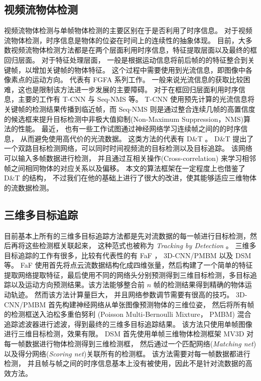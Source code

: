 \subsection{视频流物体检测}
\label{video_detect}
视频流物体检测与单帧物体检测的主要区别在于是否利用了时序信息。 对于视频流物体检测，时序信息是物体的位姿在时间上的连续性的抽象体现。 目前，大多数视频流物体检测方法都是在两个层面利用时序信息，特征提取层面以及最终的框回归层面。 对于特征处理层面， 一般是根据运动信息将前后帧的的特征整合到关键帧，以增加关键帧的物体特征。 这个过程中需要使用到光流信息，即图像中各像素点的运动方向。 代表有 FGFA \cite{zhu2017flow}系列工作。 一般来说光流信息的获取比较困难，这也是限制该方法进一步发展的主要障碍。 对于在框回归层面利用时序信息，主要的工作有 T-CNN \cite{kang2018t, kang2016object} 与 Seq-NMS \cite{han2016seq}等。 T-CNN 使用预先计算的光流信息将关键帧的检测结果传播到临近帧，而 Seq-NMS 则是通过整合连续几帧的高置信度的候选框来提升目标检测中非极大值抑制(Non-Maximum Suppression，NMS)算法的性能。 最近， 也有一些工作试图通过神经网络学习连续帧之间的的时序信息， 从而避免使用高代价的光流数据。 这类方法的代表有 D\&T \cite{feichtenhofer2017detect}。 D\&T 提出了一个双路目标检测网络，可以同时时间视频流的目标检测以及目标追踪。 该网络可以输入多帧数据进行检测， 并且通过互相关操作(Cross-correlation) 来学习相邻帧之间相同物体的对应关系以及偏移。 本文的算法框架在一定程度上也借鉴了 D\&T 的结构， 不过我们在他的基础上进行了很大的改进，使其能够适应三维物体的流数据检测。

\subsection{三维多目标追踪}
\label{tracking}
目前基本上所有的三维多目标追踪方法都是先对流数据的每一帧进行目标检测，然后再将这些检测框关联起来， 这种范式也被称为 \textit{Tracking by Detection} \cite{lenz2015followme}。 三维多目标追踪的工作有很多，比较有代表性的有 FaF \cite{luo2018fast}， 3D-CNN/PMBM \cite{scheidegger2018mono}以及 DSM \cite{frossard2018end}等。 FaF 使用首先将点云流数据结构化成四维张量，然后构建了一个简单的特征提取网络提取特征，最后使用不同的网络头分别预测得到三维目标检测，多目标追踪以及运动方向预测结果。该方法能够整合前 $n$ 帧的检测结果得到精确的物体运动轨迹。 然而该方法计算量巨大， 并且网络参数调节需要有很高的技巧。  3D-CNN/PMBM 首先构建神经网络从单张图像预测物体的三维位姿， 然后将所有帧的检测框送入泊松多重伯努利 (Poisson Multi-Bernoulli Mixture， PMBM) 混合追踪滤波器进行滤波，得到最终的三维多目标追踪结果。 该方法只使用单帧图像进行三维目标检测，效果有限。 DSM 首先使用单帧三维物体检测框架 MV3D \cite{chen2017multi} 对每一帧数据进行物体检测得到三维检测框， 然后通过一个匹配网络(\textit{Matching net})以及得分网络(\textit{Scoring net})关联所有的检测框。 该方法需要对每一帧数据都进行检测， 并且帧与帧之间的时序信息基本上没有被使用，因此不是针对流数据的高效方法。

